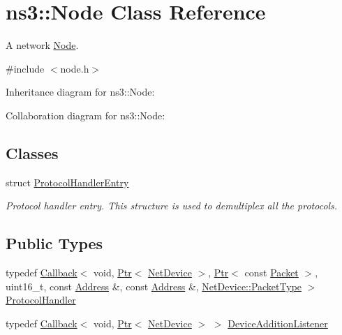 \hypertarget{classns3_1_1Node}{}\section{ns3\+:\+:Node Class Reference}
\label{classns3_1_1Node}


A network \hyperlink{classns3_1_1Node}{Node}.  




{\ttfamily \#include $<$node.\+h$>$}



Inheritance diagram for ns3\+:\+:Node\+:


Collaboration diagram for ns3\+:\+:Node\+:
\subsection*{Classes}
\begin{DoxyCompactItemize}
\item 
struct \hyperlink{structns3_1_1Node_1_1ProtocolHandlerEntry}{Protocol\+Handler\+Entry}
\begin{DoxyCompactList}\small\item\em Protocol handler entry. This structure is used to demultiplex all the protocols. \end{DoxyCompactList}\end{DoxyCompactItemize}
\subsection*{Public Types}
\begin{DoxyCompactItemize}
\item 
typedef \hyperlink{classns3_1_1Callback}{Callback}$<$ void, \hyperlink{classns3_1_1Ptr}{Ptr}$<$ \hyperlink{classns3_1_1NetDevice}{Net\+Device} $>$, \hyperlink{classns3_1_1Ptr}{Ptr}$<$ const \hyperlink{classns3_1_1Packet}{Packet} $>$, uint16\+\_\+t, const \hyperlink{classns3_1_1Address}{Address} \&, const \hyperlink{classns3_1_1Address}{Address} \&, \hyperlink{classns3_1_1NetDevice_ace65153f09144f55a0d3e702fc29d6b2}{Net\+Device\+::\+Packet\+Type} $>$ \hyperlink{classns3_1_1Node_a4ce20b9442f89703d242ce3a3fa3dbf2}{Protocol\+Handler}
\item 
typedef \hyperlink{classns3_1_1Callback}{Callback}$<$ void, \hyperlink{classns3_1_1Ptr}{Ptr}$<$ \hyperlink{classns3_1_1NetDevice}{Net\+Device} $>$ $>$ \hyperlink{classns3_1_1Node_a29fd546b16195fd0ac8848ee107b5bc0}{Device\+Addition\+Listener}
\end{DoxyCompactItemize}
